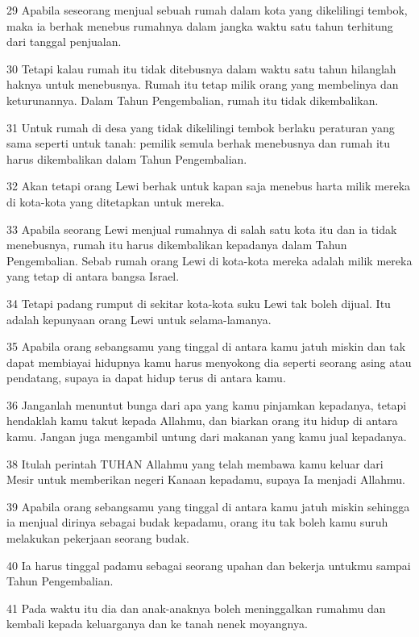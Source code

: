 \par 29 Apabila seseorang menjual sebuah rumah dalam kota yang dikelilingi tembok, maka ia berhak menebus rumahnya dalam jangka waktu satu tahun terhitung dari tanggal penjualan.
\par 30 Tetapi kalau rumah itu tidak ditebusnya dalam waktu satu tahun hilanglah haknya untuk menebusnya. Rumah itu tetap milik orang yang membelinya dan keturunannya. Dalam Tahun Pengembalian, rumah itu tidak dikembalikan.
\par 31 Untuk rumah di desa yang tidak dikelilingi tembok berlaku peraturan yang sama seperti untuk tanah: pemilik semula berhak menebusnya dan rumah itu harus dikembalikan dalam Tahun Pengembalian.
\par 32 Akan tetapi orang Lewi berhak untuk kapan saja menebus harta milik mereka di kota-kota yang ditetapkan untuk mereka.
\par 33 Apabila seorang Lewi menjual rumahnya di salah satu kota itu dan ia tidak menebusnya, rumah itu harus dikembalikan kepadanya dalam Tahun Pengembalian. Sebab rumah orang Lewi di kota-kota mereka adalah milik mereka yang tetap di antara bangsa Israel.
\par 34 Tetapi padang rumput di sekitar kota-kota suku Lewi tak boleh dijual. Itu adalah kepunyaan orang Lewi untuk selama-lamanya.
\par 35 Apabila orang sebangsamu yang tinggal di antara kamu jatuh miskin dan tak dapat membiayai hidupnya kamu harus menyokong dia seperti seorang asing atau pendatang, supaya ia dapat hidup terus di antara kamu.
\par 36 Janganlah menuntut bunga dari apa yang kamu pinjamkan kepadanya, tetapi hendaklah kamu takut kepada Allahmu, dan biarkan orang itu hidup di antara kamu. Jangan juga mengambil untung dari makanan yang kamu jual kepadanya.
\par 38 Itulah perintah TUHAN Allahmu yang telah membawa kamu keluar dari Mesir untuk memberikan negeri Kanaan kepadamu, supaya Ia menjadi Allahmu.
\par 39 Apabila orang sebangsamu yang tinggal di antara kamu jatuh miskin sehingga ia menjual dirinya sebagai budak kepadamu, orang itu tak boleh kamu suruh melakukan pekerjaan seorang budak.
\par 40 Ia harus tinggal padamu sebagai seorang upahan dan bekerja untukmu sampai Tahun Pengembalian.
\par 41 Pada waktu itu dia dan anak-anaknya boleh meninggalkan rumahmu dan kembali kepada keluarganya dan ke tanah nenek moyangnya.
